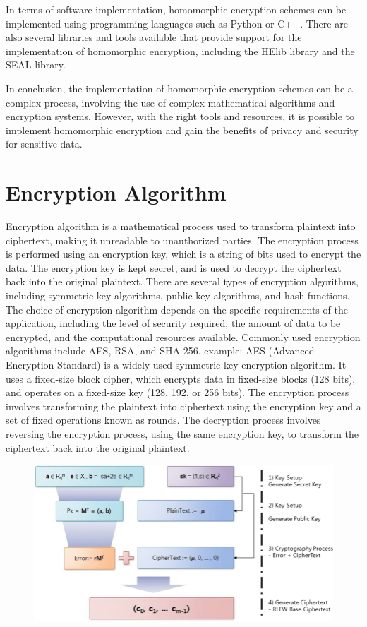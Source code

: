 \documentclass[a4paper,11pt]{report}
\begin{document}
In terms of software implementation, homomorphic encryption schemes can be implemented using programming languages such as Python or C++. There are also several libraries and tools available that provide support for the implementation of homomorphic encryption, including the HElib library and the SEAL library.

In conclusion, the implementation of homomorphic encryption schemes can be a complex process, involving the use of complex mathematical algorithms and encryption systems. However, with the right tools and resources, it is possible to implement homomorphic encryption and gain the benefits of privacy and security for sensitive data.
\section{Encryption Algorithm}
Encryption algorithm is a mathematical process used to transform plaintext into ciphertext, making it unreadable to unauthorized parties. The encryption process is performed using an encryption key, which is a string of bits used to encrypt the data. The encryption key is kept secret, and is used to decrypt the ciphertext back into the original plaintext. There are several types of encryption algorithms, including symmetric-key algorithms, public-key algorithms, and hash functions. The choice of encryption algorithm depends on the specific requirements of the application, including the level of security required, the amount of data to be encrypted, and the computational resources available. Commonly used encryption algorithms include AES, RSA, and SHA-256.
example: AES (Advanced Encryption Standard) is a widely used symmetric-key encryption algorithm. It uses a fixed-size block cipher, which encrypts data in fixed-size blocks (128 bits), and operates on a fixed-size key (128, 192, or 256 bits). The encryption process involves transforming the plaintext into ciphertext using the encryption key and a set of fixed operations known as rounds. The decryption process involves reversing the encryption process, using the same encryption key, to transform the ciphertext back into the original plaintext.
 \begin{figure}[h]
	\centering
	\hspace{21pt}
	\includegraphics[width=.70\linewidth]{algo.png}
	\label{fig:type.png}
\end{figure}
\end{document}

